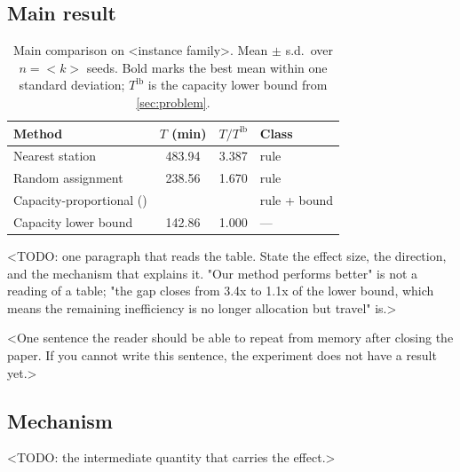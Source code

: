 \documentclass[10pt]{article}
\begin{document}
\subsection{Main result}
\begin{table}[t]
  \centering
  \caption{Main comparison on <instance family>. Mean $\pm$ s.d.\ over $n=<k>$
    seeds. Bold marks the best mean within one standard deviation;
    $T^{\mathrm{lb}}$ is the capacity lower bound from \cref{sec:problem}.}
  \label{tab:main}
  \begin{tabular}{@{}lS[table-format=3.2]S[table-format=1.3]l@{}}
    \toprule
    Method & {$T$ (min)} & {$T/T^{\mathrm{lb}}$} & Class \\
    \midrule
    Nearest station            & 483.94 & 3.387 & rule \\
    Random assignment          & 238.56 & 1.670 & rule \\
    Capacity-proportional () &  &  & rule + bound \\
    \midrule
    Capacity lower bound       & 142.86 & 1.000 & --- \\
    \bottomrule
  \end{tabular}
\end{table}

<TODO: one paragraph that reads the table. State the effect size, the direction,
and the mechanism that explains it. "Our method performs better" is not a reading
of a table; "the gap closes from 3.4x to 1.1x of the lower bound, which means the
remaining inefficiency is no longer allocation but travel" is.>

\begin{csftake}
  <One sentence the reader should be able to repeat from memory after closing the
  paper. If you cannot write this sentence, the experiment does not have a result
  yet.>
\end{csftake}

\subsection{Mechanism}
<TODO: the intermediate quantity that carries the effect.>
\end{document}
